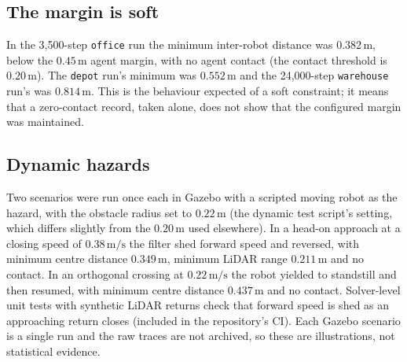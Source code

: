 \documentclass[12pt]{article}
\newcommand{\si}[1]{\mathrm{#1}}
\begin{document}
\subsection{The margin is soft}
In the 3{,}500-step \texttt{office} run the minimum inter-robot distance was
$0.382\,\si{m}$, below the $0.45\,\si{m}$ agent margin, with no agent contact
(the contact threshold is $0.20\,\si{m}$). The \texttt{depot} run's minimum
was $0.552\,\si{m}$ and the 24{,}000-step \texttt{warehouse} run's was
$0.814\,\si{m}$. This is the behaviour expected of a soft constraint; it
means that a zero-contact record, taken alone, does not show that the
configured margin was maintained.

\subsection{Dynamic hazards}
Two scenarios were run once each in Gazebo with a scripted moving robot as
the hazard, with the obstacle radius set to $0.22\,\si{m}$ (the dynamic
test script's setting, which differs slightly from the $0.20\,\si{m}$ used
elsewhere). In a head-on approach at a closing speed of $0.38\,\si{m/s}$ the
filter shed forward speed and reversed, with minimum centre distance
$0.349\,\si{m}$, minimum LiDAR range $0.211\,\si{m}$ and no contact. In an
orthogonal crossing at $0.22\,\si{m/s}$ the robot yielded to standstill and
then resumed, with minimum centre distance $0.437\,\si{m}$ and no contact.
Solver-level unit tests with synthetic LiDAR returns check that forward
speed is shed as an approaching return closes (included in the repository's
CI). Each Gazebo scenario is a single run and the raw traces are not
archived, so these are illustrations, not statistical evidence.
\end{document}
